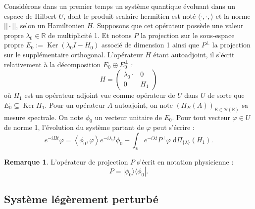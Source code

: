 \documentclass[12pt,openany,a4paper, titlepage]{article}
\newcommand{\lp}{\left(}
\newcommand{\rp}{\right)}
\newcommand{\la}{\left\langle}
\newcommand{\ra}{\right\rangle}
\newcommand{\dd}{\;\mathrm{d}}
\newcommand{\R}{\mathbb{R}}
\newcommand{\St}[2]{e^{-i #1 #2}}
\newcommand{\ortho}{P^\perp}
\newcommand{\Ker}{\operatorname{Ker}}
\theoremstyle{definition}
\theoremstyle{definition}
\theoremstyle{definition}
\theoremstyle{definition}
\theoremstyle{definition}
\newtheorem{rem}{Remarque}
\theoremstyle{definition}
\begin{document}
Considérons dans un premier temps un système quantique évoluant dans un espace de Hilbert $U$, dont le produit scalaire hermitien est noté $\langle \cdot, \cdot, \rangle$ et la norme $||\cdot ||$, selon un Hamiltonien $H$. Supposons que cet opérateur possède une valeur propre $\lambda_0 \in \R$ de multiplicité 1. Et notons $P$ la projection sur le sous-espace propre $E_0 := \Ker\lp \lambda_0 I - H_0 \rp$ associé de dimension 1 ainsi que $\ortho$ la projection sur le supplémentaire orthogonal. L'opérateur $H$ étant autoadjoint, il s'écrit relativement à la décomposition $E_0\oplus E_0^\perp$ :
\begin{equation}
    H = \begin{pmatrix}
    \lambda_0 \cdot & 0 \\
    0 & H_1 
\end{pmatrix}
\end{equation}
où $H_1$ est un opérateur adjoint vue comme opérateur de $U$ dans $U$ de sorte que $E_0 \subseteq \Ker H_1$. Pour un opérateur $A$ autoajoint, on note $\lp\Pi_E(A)\rp_{E\in\mathcal{B}(\R)}$ sa mesure spectrale. On note $\phi_0$ un vecteur unitaire de $E_0$. Pour tout vecteur $\varphi \in U$ de norme 1, l'évolution du système partant de $\varphi$ peut s'écrire :
$$\St{H}{t}\varphi = \la \phi_0, \varphi \ra \St{\lambda_0}{t} \phi_0 + \int_\R \St{\lambda}{t}\ortho \varphi \dd \Pi_{\{\lambda\}}(H_1).$$

\begin{rem}
L'opérateur de projection $P$ s'écrit en notation physicienne : $$ P = |\phi_0\rangle \langle \phi_0|.$$
\end{rem}

\subsection{Système légèrement perturbé}
\end{document}
